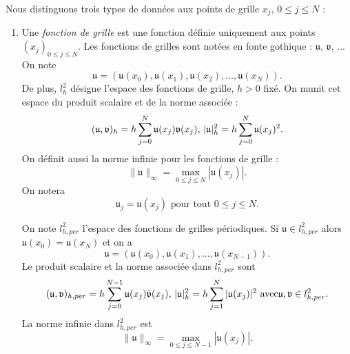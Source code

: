 Nous distinguons trois types de données aux points de grille $x_j$, $0 \leq j \leq N$ :
\begin{enumerate}
\item Une \textit{fonction de grille} est une fonction définie uniquement aux points $(x_j)_{0 \leq j \leq N}$. Les fonctions de grilles sont notées en fonte gothique : $\mathfrak{u}$, $\mathfrak{v}$, ... 
On note
\begin{equation}
\mathfrak{u} = (\mathfrak{u}(x_0), \mathfrak{u}(x_1), \mathfrak{u}(x_2), ... , \mathfrak{u}(x_N)).
\end{equation}
De plus, $l^2_h$ désigne l'espace des fonctions de grille, $h>0$ fixé.
On munit cet espace du produit scalaire et de la norme associée :
\begin{equation}
(\mathfrak{u},\mathfrak{v})_h = h \displaystyle\sum\limits_{j=0}^N \mathfrak{u}(x_j) \mathfrak{v}(x_j) \text{,  } |\mathfrak{u}|_h^2 = h \displaystyle\sum\limits_{j=0}^N \mathfrak{u}(x_j)^2.
\end{equation}
On définit aussi la norme infinie pour les fonctions de grille :
\begin{equation}
\| \mathfrak{u} \|_{\infty} = \max_{0\leq j \leq N} |\mathfrak{u}(x_j)|.
\end{equation}
On notera 
\begin{equation}
\mathfrak{u}_j = \mathfrak{u}(x_j) \text{ pour tout } 0\leq j \leq N.  
\end{equation}

On note $l^2_{h,per}$ l'espace des fonctions de grilles périodiques. Si $\mathfrak{u} \in l^2_{h,per}$ alors $\mathfrak{u}(x_0) = \mathfrak{u}(x_N)$ et on a
\begin{equation}
\mathfrak{u}=(\mathfrak{u}(x_0), \mathfrak{u}(x_1), ..., \mathfrak{u}(x_{N-1})).
\end{equation}
Le produit scalaire et la norme associée dans $l^2_{h,per}$ sont
\begin{equation}
(\mathfrak{u},\mathfrak{v})_{h,per} = h \displaystyle\sum\limits_{j=0}^{N-1} \mathfrak{u}(x_j) \bar{\mathfrak{v}}(x_j) \text{,  } |\mathfrak{u}|_h^2 = h \displaystyle\sum\limits_{j=1}^N |\mathfrak{u}(x_j)|^2 \text{ avec} \mathfrak{u}, \mathfrak{v} \in l^2_{h,per}.
\end{equation}
La norme infinie dans $l^2_{h,per}$ est
\begin{equation}
\| \mathfrak{u} \|_{\infty} = \max_{0\leq j \leq N-1} |\mathfrak{u}(x_j)|.
\end{equation}




\end{enumerate}
